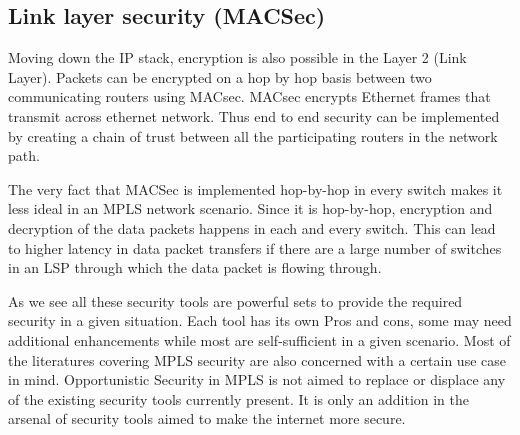 \subsection{Link layer security (MACSec)}
Moving down the IP stack, encryption is also possible in the Layer 2 (Link Layer). Packets can be encrypted on a hop by hop basis between two communicating routers using MACsec. MACsec encrypts Ethernet frames that transmit across ethernet network. Thus end to end security can be implemented by creating a chain of trust between all the participating routers in the network path.

The very fact that MACSec is implemented hop-by-hop in every switch makes it less ideal in an MPLS network scenario. Since it is hop-by-hop, encryption and decryption of the data packets happens in each and every switch. This can lead to higher latency in data packet transfers if there are a large number of switches in an LSP through which the data packet is flowing through.

As we see all these security tools are powerful sets to provide the required security in a given situation. Each tool has its own Pros and cons, some may need additional enhancements while most are self-sufficient in a given scenario. Most of the literatures covering MPLS security are also concerned with a certain use case in mind. Opportunistic Security in MPLS is not aimed to replace or displace any of the existing security tools currently present. It is only an addition in the arsenal of security tools aimed to make the internet more secure.   
